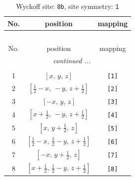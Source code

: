 \documentclass[fleqn,8pt]{jsarticle}
\begin{document}
\begin{longtable}{ccc}
\caption{Wyckoff site: {\tt 8b}, site symmetry: {\tt 1}}
 \\
 \hline \hline
No. & position & mapping \\ \hline \endfirsthead

\multicolumn{2}{l}{\tablename\ \thetable{}} \\
 \hline \hline
No. & position & mapping \\ \hline \endhead

 \hline \hline
\multicolumn{2}{r}{\footnotesize\it continued ...} \\ \endfoot

 \hline \hline
\multicolumn{2}{r}{} \\ \endlastfoot

1 & $\left[ x,\, y,\, z \right]$ & {\tt [1]} \\ \hline
2 & $\left[ \frac{1}{2} - x,\, - y,\, z + \frac{1}{2} \right]$ & {\tt [2]} \\ \hline
3 & $\left[ - x,\, y,\, z \right]$ & {\tt [3]} \\ \hline
4 & $\left[ x + \frac{1}{2},\, - y,\, z + \frac{1}{2} \right]$ & {\tt [4]} \\ \hline
5 & $\left[ x,\, y + \frac{1}{2},\, z \right]$ & {\tt [5]} \\ \hline
6 & $\left[ \frac{1}{2} - x,\, \frac{1}{2} - y,\, z + \frac{1}{2} \right]$ & {\tt [6]} \\ \hline
7 & $\left[ - x,\, y + \frac{1}{2},\, z \right]$ & {\tt [7]} \\ \hline
8 & $\left[ x + \frac{1}{2},\, \frac{1}{2} - y,\, z + \frac{1}{2} \right]$ & {\tt [8]} \\
\end{longtable}
\end{document}
